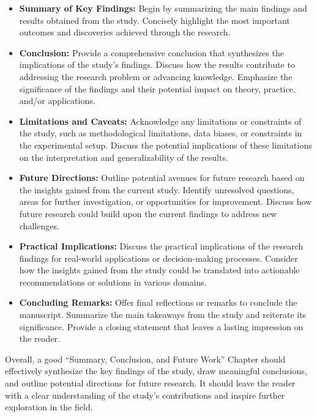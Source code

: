 \documentclass{article}
\begin{document}
\begin{itemize}
\item \textbf{Summary of Key Findings:} Begin by summarizing the main findings and results obtained from the study. Concisely highlight the most important outcomes and discoveries achieved through the research.
\item \textbf{Conclusion:} Provide a comprehensive conclusion that synthesizes the implications of the study's findings. Discuss how the results contribute to addressing the research problem or advancing knowledge. Emphasize the significance of the findings and their potential impact on theory, practice, and/or applications.
\item \textbf{Limitations and Caveats:} Acknowledge any limitations or constraints of the study, such as methodological limitations, data biases, or constraints in the experimental setup. Discuss the potential implications of these limitations on the interpretation and generalizability of the results.
\item \textbf{Future Directions:} Outline potential avenues for future research based on the insights gained from the current study. Identify unresolved questions, areas for further investigation, or opportunities for improvement. Discuss how future research could build upon the current findings to address new challenges.
\item \textbf{Practical Implications:} Discuss the practical implications of the research findings for real-world applications or decision-making processes. Consider how the insights gained from the study could be translated into actionable recommendations or solutions in various domains.
\item \textbf{Concluding Remarks:} Offer final reflections or remarks to conclude the manuscript. Summarize the main takeaways from the study and reiterate its significance. Provide a closing statement that leaves a lasting impression on the reader.
\end{itemize}

Overall, a good ``Summary, Conclusion, and Future Work'' Chapter should effectively synthesize the key findings of the study, draw meaningful conclusions, and outline potential directions for future research. It should leave the reader with a clear understanding of the study's contributions and inspire further exploration in the field.

\printbibliography
\end{document}

